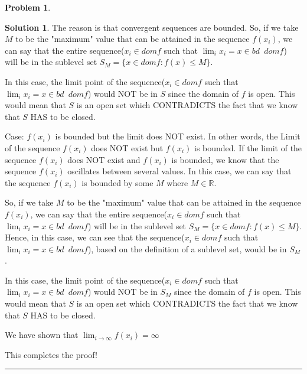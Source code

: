 \documentclass{article}
\theoremstyle{definition}
\newtheorem{problem}{Problem}
\def\fline{\rule{0.75\linewidth}{0.5pt}}
\newcommand{\finishline}{\begin{center}\fline\end{center}}
\newtheorem*{solution*}{Solution}
\newenvironment{solution}{\begin{solution*}}{{\finishline} \end{solution*}}
\begin{document}
\begin{problem}
\begin{solution}
The reason is that convergent sequences are bounded. So, if we take $M$ to be the "maximum" value that can be attained in the sequence $f(x_i)$, we can say that the entire sequence($x_i \in dom f$ such that $\lim_{i} x_i = x \in bd \enspace dom f$) will be in the sublevel set $S_M = \{x \in dom f : f(x) \leq M \}$. \newline 

In this case, the limit point of the sequence($x_i \in dom f$ such that $\lim_{i} x_i = x \in bd \enspace dom f$) would NOT be in $S$ since the domain of $f$ is open. This would mean that $S$ is an open set which CONTRADICTS the fact that we know that $S$ HAS to be closed. \newline 

Case: $f(x_i)$ is bounded but the limit does NOT exist. In other words, the Limit of the sequence $f(x_i)$ does NOT exist but $f(x_i)$ is bounded. \newline 
If the limit of the sequence $f(x_i)$ does NOT exist and $f(x_i)$ is bounded, we know that the sequence $f(x_i)$ oscillates between several values. In this case, we can say that the sequence $f(x_i)$ is bounded by some $M$ where $M \in \mathbb{R}$. \newline 

So, if we take $M$ to be the "maximum" value that can be attained in the sequence $f(x_i)$, we can say that the entire sequence($x_i \in dom f$ such that $\lim_{i} x_i = x \in bd \enspace dom f$) will be in the sublevel set $S_M = \{x \in dom f : f(x) \leq M \}$. Hence, in this case, we can see that the sequence($x_i \in dom f$ such that $\lim_{i} x_i = x \in bd \enspace dom f$), based on the definition of a sublevel set, would be in $S_M$. \newline 

In this case, the limit point of the sequence($x_i \in dom f$ such that $\lim_{i} x_i = x \in bd \enspace dom f$) would NOT be in $S_M$ since the domain of $f$ is open. This would mean that $S$ is an open set which CONTRADICTS the fact that we know that $S$ HAS to be closed. \newline 


We have shown that $\lim_{i\to\infty} f(x_i) = \infty$\newline 

This completes the proof! 

\end{solution}
\end{problem}
\end{document}
